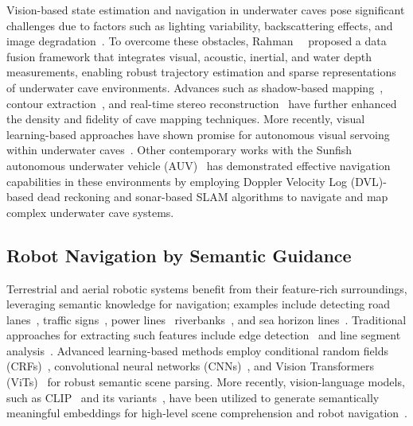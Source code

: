 Vision-based state estimation and navigation in underwater caves pose significant challenges due to factors such as lighting variability, backscattering effects, and image degradation~\cite{JoshiIROS2019}. To overcome these obstacles, Rahman~\etal~\cite{RahmanICRA2018,RahmanIJRR2022} proposed a data fusion framework that integrates visual, acoustic, inertial, and water depth measurements, enabling robust trajectory estimation and sparse representations of underwater cave environments. Advances such as shadow-based mapping~\cite{RahmanIROS2019b}, contour extraction~\cite{massone2020contour}, and real-time stereo reconstruction~\cite{WangICRA2023} have further enhanced the density and fidelity of cave mapping techniques. More recently, visual learning-based approaches have shown promise for autonomous visual servoing within underwater caves~\cite{abdullah2023caveseg,yu2023weakly}. Other contemporary works with the Sunfish autonomous underwater vehicle (AUV)~\cite{richmond2020autonomous} has demonstrated effective navigation capabilities in these environments by employing Doppler Velocity Log (DVL)-based dead reckoning and sonar-based SLAM algorithms to navigate and map complex underwater cave systems. 






 
\subsection{Robot Navigation by Semantic Guidance}

Terrestrial and aerial robotic systems benefit from their feature-rich surroundings, leveraging semantic knowledge for navigation; examples include detecting road lanes~\cite{ding2020lane}, traffic signs~\cite{bruno2017image}, power lines~\cite{ceron2018onboard,alexiou2023visual} riverbanks~\cite{yang2022image}, and sea horizon lines~\cite{gershikov2013horizon}. Traditional approaches for extracting such features include edge detection~\cite{lee2014outdoor} and line segment analysis~\cite{yang2022image}. Advanced learning-based methods employ conditional random fields (CRFs)~\cite{zhan2020adaptive}, convolutional neural networks (CNNs)~\cite{steccanella2019deep}, and Vision Transformers (ViTs)~\cite{du2021vtnet,panda2023agronav} for robust semantic scene parsing. More recently, vision-language models, such as CLIP~\cite{radford2021learning} and its variants~\cite{shah2023lm,sontakke2024roboclip}, have been utilized to generate semantically meaningful embeddings for high-level scene comprehension and robot navigation~\cite{huang2023visual,dorbala2022clip}.


